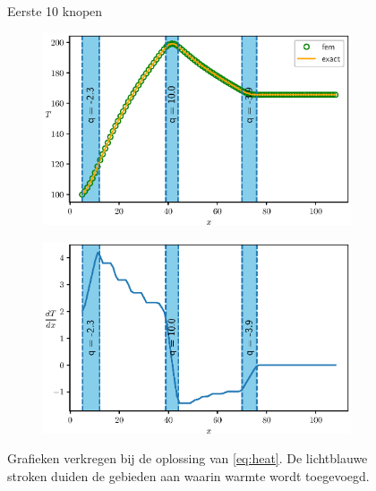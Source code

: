 \documentclass[titlepage]{article}
\begin{document}
\begin{figure}[!htb]
  \begin{displaymath}
    
  \end{displaymath}
  \caption{Eerste 10 knopen}
  \label{tab:nodes}
\end{figure}

\begin{figure}[!p]
  \begin{subfigure}{\linewidth}
    \centering
    \includegraphics{sol}
    \label{fig:sol-plot}
  \end{subfigure}
  \begin{subfigure}{\linewidth}
    \centering
    \includegraphics{grad}
    \label{fig:grad-plot}
  \end{subfigure}
  \caption{Grafieken verkregen bij de oplossing van \cref{eq:heat}. De lichtblauwe stroken duiden de gebieden aan waarin warmte wordt toegevoegd.}
\end{figure}
\end{document}
